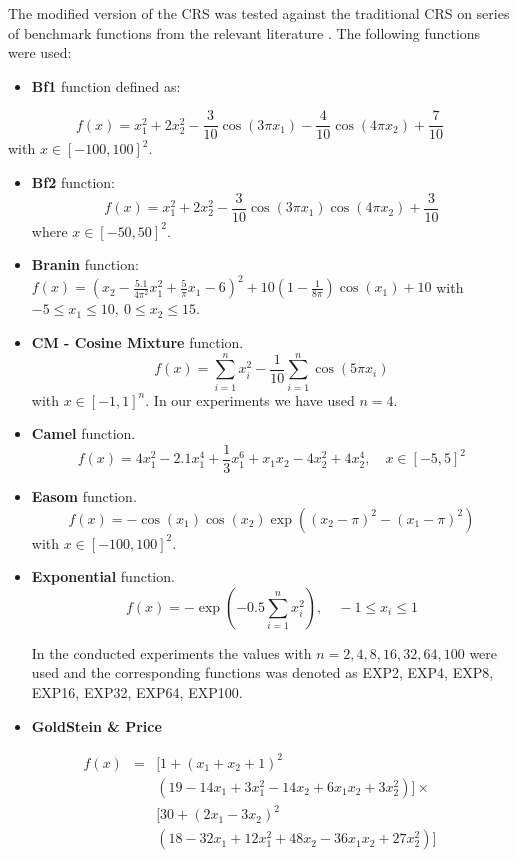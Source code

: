 \documentclass[symmetry,article,submit,moreauthors,pdftex]{Definitions/mdpi}
\begin{document}
The modified version of the CRS was tested against the traditional
CRS on series of benchmark functions from the relevant literature
\cite{Ali1,Floudas1}. The following functions were used: 
\begin{itemize}
\item \textbf{Bf1} function defined as:

\end{itemize}
\[
f(x)=x_{1}^{2}+2x_{2}^{2}-\frac{3}{10}\cos\left(3\pi x_{1}\right)-\frac{4}{10}\cos\left(4\pi x_{2}\right)+\frac{7}{10}
\]
with $x\in[-100,100]^{2}$. 
\begin{itemize}
\item \textbf{Bf2} function:
\[
f(x)=x_{1}^{2}+2x_{2}^{2}-\frac{3}{10}\cos\left(3\pi x_{1}\right)\cos\left(4\pi x_{2}\right)+\frac{3}{10}
\]
where $x\in[-50,50]^{2}$. 
\item \textbf{Branin} function:
$f(x)=\left(x_{2}-\frac{5.1}{4\pi^{2}}x_{1}^{2}+\frac{5}{\pi}x_{1}-6\right)^{2}+10\left(1-\frac{1}{8\pi}\right)\cos(x_{1})+10$
with $-5\le x_{1}\le10,\ 0\le x_{2}\le15$.
\item \textbf{CM - Cosine Mixture} function. 
\[
f(x)=\sum_{i=1}^{n}x_{i}^{2}-\frac{1}{10}\sum_{i=1}^{n}\cos\left(5\pi x_{i}\right)
\]
with $x\in[-1,1]^{n}$. In our experiments we have used $n=4$.
\item \textbf{Camel} function. 
\[
f(x)=4x_{1}^{2}-2.1x_{1}^{4}+\frac{1}{3}x_{1}^{6}+x_{1}x_{2}-4x_{2}^{2}+4x_{2}^{4},\quad x\in[-5,5]^{2}
\]
\item \textbf{Easom} function. 
\[
f(x)=-\cos\left(x_{1}\right)\cos\left(x_{2}\right)\exp\left(\left(x_{2}-\pi\right)^{2}-\left(x_{1}-\pi\right)^{2}\right)
\]
with $x\in[-100,100]^{2}.$ 
\item \textbf{Exponential} function. 
\[
f(x)=-\exp\left(-0.5\sum_{i=1}^{n}x_{i}^{2}\right),\quad-1\le x_{i}\le1
\]

In the conducted experiments the values with $n=2,4,8,16,32,64,100$ were used and the corresponding functions was denoted as EXP2, EXP4,
EXP8, EXP16, EXP32, EXP64, EXP100.
\item \textbf{GoldStein \& Price }
\end{itemize}
\begin{eqnarray*}
f(x) & = & [1+(x_{1}+x_{2}+1)^{2}\\
 &  & (19-14x_{1}+3x_{1}^{2}-14x_{2}+6x_{1}x_{2}+3x_{2}^{2})]\times\\
 &  & [30+(2x_{1}-3x_{2})^{2}\\
 &  & (18-32x_{1}+12x_{1}^{2}+48x_{2}-36x_{1}x_{2}+27x_{2}^{2})]
\end{eqnarray*}
\end{document}
